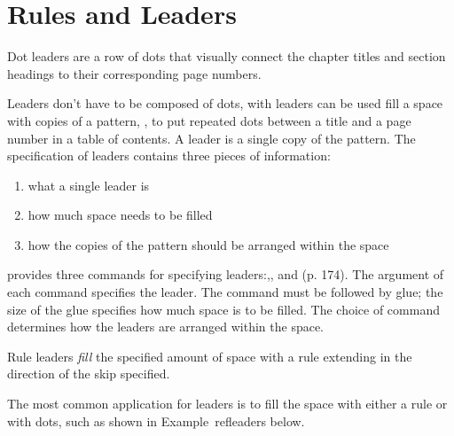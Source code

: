 
\chapter{Rules and Leaders}

Dot leaders are a row of dots that visually connect the chapter titles and section headings to their corresponding page numbers. 

Leaders don't have to be composed of dots, with \tex leaders can be used fill a space with copies of a pattern,
\eg, to put repeated dots between a title and a page number in a table
of contents. A leader is a single copy of the pattern. The specification of
leaders contains three pieces of information:

\begin{enumerate}
\item  what a single leader is
\item  how much space needs to be filled
\item  how the copies of the pattern should be arranged within the space
\end{enumerate}

\begin{macro}{\leaders}
\begin{macro}{\cleaders}
\begin{macro}{\xleaders}
\tex  provides three commands for specifying leaders:,,
and (p. 174). The argument of each command specifies the
leader. The command must be followed by glue; the size of the glue specifies
how much space is to be filled. The choice of command determines how
the leaders are arranged within the space.
\end{macro}
\end{macro}
\end{macro}

Rule leaders \textit{fill} the specified amount of space with a rule extending in the direction of the skip
specified. 

The most common application for leaders is to fill the space with either a rule or with dots, such as shown in Example~ref{leaders} below.


